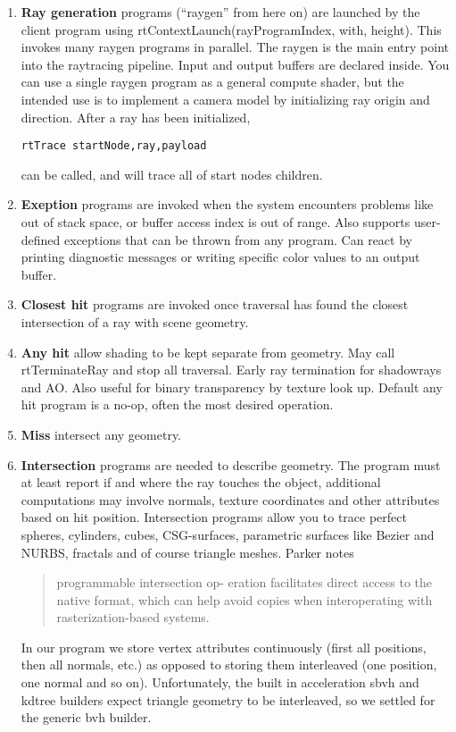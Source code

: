 \begin{enumerate}
	\item {
	\textbf{Ray generation}
      programs (``raygen'' from here on) are launched by the client program using rtContextLaunch(rayProgramIndex, with, height). This invokes many raygen programs in parallel. The raygen is the main entry point into the raytracing pipeline. Input and output buffers are declared inside. You can use a single raygen program as a general compute shader, but the intended use is to implement a camera model by initializing ray origin and direction. After a ray has been initialized, \begin{verbatim}rtTrace startNode,ray,payload \end{verbatim} can be called, and will trace all of start nodes children. 
	}

	\item{\textbf{Exeption} programs are invoked when the system encounters problems like out of stack space, or buffer access index is                   out of range. Also supports user-defined exceptions that can be 	thrown from any program. Can react by printing                         diagnostic messages or   writing specific color values to an output buffer.}

	\item{\textbf{Closest hit} programs are invoked once traversal has found the closest intersection of a ray with scene geometry.}

	\item{\textbf{Any hit}
		allow shading to be kept separate from geometry.
		May call rtTerminateRay and stop all traversal. Early ray termination for shadowrays and AO.
		Also useful for binary transparency by texture look up.
		Default any hit program is a no-op, often the most desired operation.
		}

	\item{\textbf{Miss} intersect any geometry. }

	\item {\textbf{Intersection}
	programs are needed to describe geometry. The program must at least report if and where the ray touches the object, 
	additional computations may involve normals, texture coordinates and other attributes based on hit position.
	Intersection programs allow you to trace perfect spheres, cylinders, cubes,  CSG-surfaces, parametric surfaces like
	Bezier and NURBS, fractals and of course triangle meshes. Parker \cite{Parker10OptiX} notes \begin{quote} programmable intersection op-
	eration facilitates direct access to the native format, which can help
	avoid copies when interoperating with rasterization-based systems.\end{quote} In our program we store vertex attributes continuously (first all positions, then all normals, etc.) as opposed to storing them interleaved (one position, one normal and so on). Unfortunately, the built in acceleration sbvh and kdtree builders expect triangle geometry to be interleaved, so we settled for the generic bvh builder.
	}
	

\end{enumerate}
